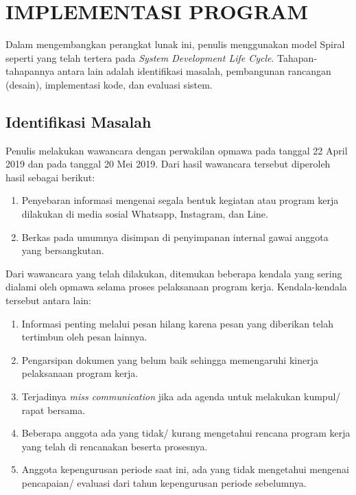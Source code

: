 
\chapter{IMPLEMENTASI PROGRAM}

Dalam mengembangkan perangkat lunak ini, penulis menggunakan model Spiral seperti yang telah tertera pada \emph{System Development Life Cycle}. Tahapan-tahapannya antara lain adalah identifikasi masalah, pembangunan rancangan (desain), implementasi kode, dan evaluasi sistem.



\section{Identifikasi Masalah}

Penulis melakukan wawancara dengan perwakilan opmawa pada tanggal 22 April 2019 dan pada tanggal 20 Mei 2019. Dari hasil wawancara tersebut diperoleh hasil sebagai berikut: 

\begin{enumerate}
	\item Penyebaran informasi mengenai segala bentuk kegiatan atau program kerja dilakukan di media sosial Whatsapp, Instagram, dan Line.
	
	\item Berkas pada umumnya disimpan di penyimpanan internal gawai anggota yang bersangkutan.
\end{enumerate}

Dari wawancara yang telah dilakukan, ditemukan beberapa kendala yang sering dialami oleh opmawa selama proses pelaksanaan program kerja. Kendala-kendala tersebut antara lain:

\begin{enumerate}
	\item Informasi penting melalui pesan hilang karena pesan yang diberikan telah tertimbun oleh pesan lainnya.
	
	\item Pengarsipan dokumen yang belum baik sehingga memengaruhi kinerja pelaksanaan program kerja.
	
	\item Terjadinya \emph{miss communication} jika ada agenda untuk melakukan kumpul/ rapat bersama.
	
	\item Beberapa anggota ada yang tidak/ kurang mengetahui rencana program kerja yang telah di rencanakan beserta prosesnya.
	
	\item Anggota kepengurusan periode saat ini, ada yang tidak mengetahui mengenai pencapaian/ evaluasi dari tahun kepengurusan periode sebelumnya.
\end{enumerate}

